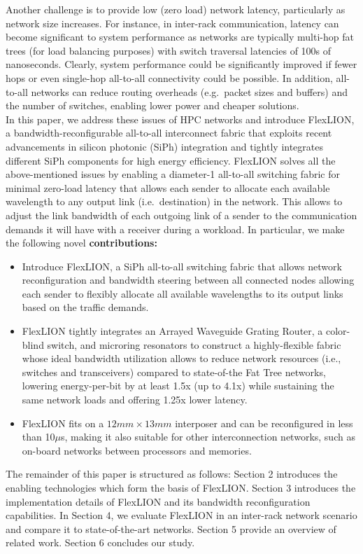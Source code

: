 Another challenge is to provide low (zero load) network latency, particularly as network size increases. For instance, in inter-rack communication, latency can become significant to system performance as networks are typically multi-hop fat trees (for load balancing purposes) with switch traversal latencies of 100s of nanoseconds. Clearly, system performance could be significantly improved if fewer hops or even single-hop all-to-all connectivity could be possible. In addition, all-to-all networks can reduce routing overheads (e.g.\ packet sizes and buffers) and the number of switches, enabling lower power and cheaper solutions. \\
In this paper, we address these issues of HPC networks and introduce FlexLION, a bandwidth-reconfigurable all-to-all interconnect fabric that exploits recent advancements in silicon photonic (SiPh) integration and tightly integrates different SiPh components for high energy efficiency. FlexLION solves all the above-mentioned issues by enabling a diameter-1 all-to-all switching fabric for minimal zero-load latency that allows each sender to allocate each available wavelength to any output link (i.e.\ destination) in the network. This allows to adjust the link bandwidth of each outgoing link of a sender to the communication demands it will have with a receiver during a workload. In particular, we make the following novel \textbf{contributions:}
\begin{itemize}
\item Introduce FlexLION, a SiPh all-to-all switching fabric that allows network reconfiguration and bandwidth steering between all connected nodes allowing each sender to flexibly allocate all available wavelengths to its output links based on the traffic demands. 
\item FlexLION tightly integrates an Arrayed Waveguide Grating Router, a color-blind switch, and microring resonators to construct a highly-flexible fabric whose ideal bandwidth utilization allows to reduce network resources (i.e., switches and transceivers) compared to state-of-the Fat Tree networks, lowering energy-per-bit by at least 1.5x (up to 4.1x) while sustaining the same network loads and offering 1.25x lower latency.
\item FlexLION fits on a  $12mm \times 13mm$ interposer and can be reconfigured in less than 10$\mu$s, making it also suitable for other interconnection networks, such as on-board networks between processors and memories. 
\end{itemize}
The remainder of this paper is structured as follows: Section 2 introduces the enabling technologies which form the basis of FlexLION. Section 3 introduces the implementation details of FlexLION and its bandwidth reconfiguration capabilities. In Section 4, we evaluate FlexLION in an inter-rack network scenario and compare it to state-of-the-art networks. Section 5 provide an overview of related work. Section 6 concludes our study. 